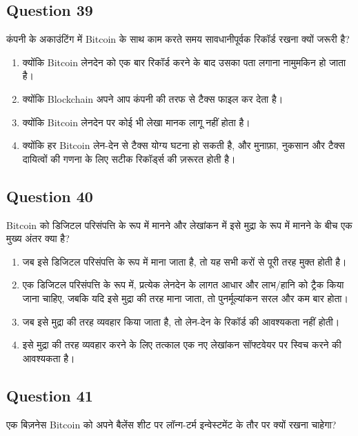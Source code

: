 \documentclass[12pt,a4paper]{article}
\begin{document}
\bigskip


\subsection*{Question 39}
कंपनी के अकाउंटिंग में Bitcoin के साथ काम करते समय सावधानीपूर्वक रिकॉर्ड रखना क्यों जरूरी है?

\begin{enumerate}[label=\Alph*., leftmargin=*]
\item क्योंकि Bitcoin लेनदेन को एक बार रिकॉर्ड करने के बाद उसका पता लगाना नामुमकिन हो जाता है।
\item क्योंकि Blockchain अपने आप कंपनी की तरफ से टैक्स फाइल कर देता है।
\item क्योंकि Bitcoin लेनदेन पर कोई भी लेखा मानक लागू नहीं होता है।
\item क्योंकि हर Bitcoin लेन-देन से टैक्स योग्य घटना हो सकती है, और मुनाफ़ा, नुकसान और टैक्स दायित्वों की गणना के लिए सटीक रिकॉर्ड्स की ज़रूरत होती है।
\end{enumerate}

\bigskip


\subsection*{Question 40}
Bitcoin को डिजिटल परिसंपत्ति के रूप में मानने और लेखांकन में इसे मुद्रा के रूप में मानने के बीच एक मुख्य अंतर क्या है?

\begin{enumerate}[label=\Alph*., leftmargin=*]
\item जब इसे डिजिटल परिसंपत्ति के रूप में माना जाता है, तो यह सभी करों से पूरी तरह मुक्त होती है।
\item एक डिजिटल परिसंपत्ति के रूप में, प्रत्येक लेनदेन के लागत आधार और लाभ/हानि को ट्रैक किया जाना चाहिए, जबकि यदि इसे मुद्रा की तरह माना जाता, तो पुनर्मूल्यांकन सरल और कम बार होता।
\item जब इसे मुद्रा की तरह व्यवहार किया जाता है, तो लेन-देन के रिकॉर्ड की आवश्यकता नहीं होती।
\item इसे मुद्रा की तरह व्यवहार करने के लिए तत्काल एक नए लेखांकन सॉफ्टवेयर पर स्विच करने की आवश्यकता है।
\end{enumerate}

\bigskip


\subsection*{Question 41}
एक बिज़नेस Bitcoin को अपने बैलेंस शीट पर लॉन्ग-टर्म इन्वेस्टमेंट के तौर पर क्यों रखना चाहेगा?
\end{document}
